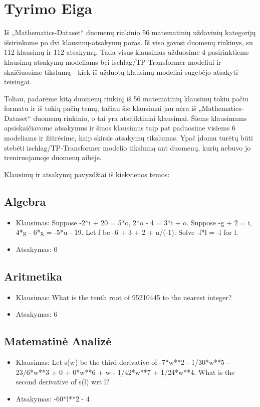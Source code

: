 \documentclass[conference]{IEEEtran}
\begin{document}
\section{Tyrimo Eiga}
Iš „Mathematics-Dataset“ duomenų rinkinio 56 matematinių uždavinių kategorijų išsirinkome
po dvi klausimų-atsakymų poras. \cite{dataset} Iš viso gavosi duomenų rinkinys, su 112 klausimų ir 112 atsakymų.
Tada visus klausimus užduosime 4 pasirinktiems klausimų-atsakymų modeliams bei ischlag/TP-Transformer \cite{tptransformer} modeliui ir skaičiuosime
tikslumą - kiek iš užduotų klausimų modeliai sugebėjo atsakyti teisingai. \par
Toliau, padarėme kitą duomenų rinkinį iš 56 matematinių klausimų tokiu pačiu formatu ir iš tokių pačių temų,
tačiau šie klausimai jau nėra iš „Mathematics-Dataset“ duomenų rinkinio, o tai yra
atsitiktiniai klausimai. Šiems klausimams apsiskaičiavome atsakymus ir šiuos klausimus taip pat paduosime
visiems 6 modeliams ir žiūrėsime, kaip skirsis atsakymų tikslumas. Ypač įdomu turėtų būti stebėti
ischlag/TP-Transformer modelio tikslumą ant duomenų, kurių nebuvo jo treniruojamoje duomenų aibėje. \par
Klausimų ir atsakymų pavyzdžiai iš kiekvienos temos:
\subsection{Algebra}
\begin{itemize}
    \item Klausimas: Suppose -2*i + 20 = 5*o, 2*o - 4 = 3*i + o. Suppose -g + 2 = i, 4*g - 6*g = -5*u - 19. Let f be -6 + 3 + 2 + u/(-1). Solve -f*l = -l for l.
    \item Atsakymas: 0
\end{itemize}
\subsection{Aritmetika}
\begin{itemize}
    \item Klausimas: What is the tenth root of 95210445 to the nearest integer?
    \item Atsakymas: 6
\end{itemize}
\subsection{Matematinė Analizė}
\begin{itemize}
    \item Klausimas: Let s(w) be the third derivative of -7*w**2 - 1/30*w**5 - 23/6*w**3 + 0 + 0*w**6 + w - 1/42*w**7 + 1/24*w**4. What is the second derivative of s(l) wrt l?
    \item Atsakymas: -60*l**2 - 4
\end{itemize}
\end{document}
